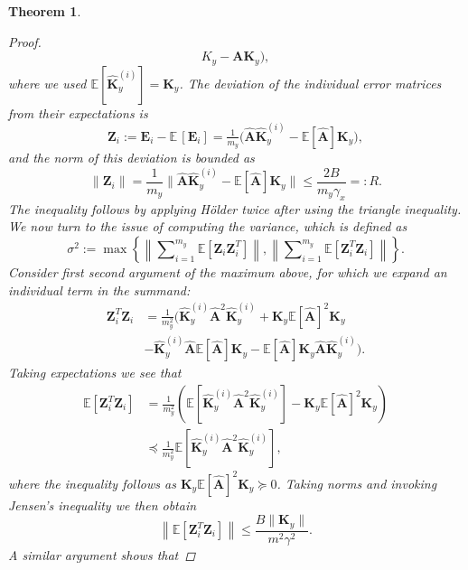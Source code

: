\documentclass{article}
\newcommand{\E}{\mathbb{E}}
\newcommand{\norm}[1]{\left\|#1\right\|}
\newcommand{\nlsum}{\sum\nolimits}
\newtheorem{theorem}{Theorem}
\begin{document}
\begin{theorem}
\begin{proof}
\begin{equation*}
    K_y - \bm A\bm K_y\bigr),
    \end{equation*}
    where we used $\E[\hat{\bm{K}}_y^{(i)}]=\bm K_y$.  The deviation of the
    individual error matrices from their expectations is
    \begin{equation*}
    \bm Z_i := \bm E_i-\mathbb{E}\,[\bm E_i] = \tfrac{1}{m_y}\bigl(\hat{\bm
    A}\hat{\bm K}^{(i)}_y-\mathbb{E}[\hat{\bm A}]\bm K_y\bigr),
    \end{equation*}
    and the norm of this deviation is bounded as
    \begin{equation*}
    \|\bm Z_i\| =\frac{1}{m_y}\|\hat{\bm A}\hat{\bm
    K}^{(i)}_y-\mathbb{E}[\hat{\bm A}]\bm K_y\| \leq \frac{2B}{m_y\gamma_x} =:
    R.
    \end{equation*}
    The inequality follows by applying H\"older twice after using the triangle
    inequality. We now turn to the issue of computing the variance, which is
    defined as
    \begin{equation*}
      \sigma^2 := \max\left\lbrace\norm{\nlsum_{i=1}^{m_y}\E[\bm Z_i\bm
      Z_i^T]},\norm{\nlsum_{i=1}^{m_y}\E[\bm Z_i^T \bm Z_i]}\right\rbrace.
    \end{equation*}
    Consider first second argument of the maximum above, for which we expand an
    individual term in the summand:
    \begin{align*}
      \bm Z_i^T \bm Z_i &= \frac{1}{m_y^2}\Big(\hat{\bm K}_y^{(i)}\hat{\bm
      A}^2\hat{\bm K}_y^{(i)} + \bm K_y\E[\hat{\bm A}]^2\bm K_y \\
      &- \hat{\bm K}_y^{(i)}\hat{\bm A}\E[\hat{\bm A}]\bm K_y - \E[\hat{\bm
      A}]\bm K_y\hat{\bm A}\hat{\bm K}_y^{(i)}\Big).
    \end{align*}
    Taking expectations we see that
    \begin{align*}
        \E[\bm Z_i^T \bm Z_i] &= \frac{1}{m_y^2}\left( \E[\hat{\bm
        K}_y^{(i)}\hat{\bm A}^2\hat{\bm K}_y^{(i)}] - \bm K_y\E[\hat{\bm
        A}]^2\bm K_y\right)\\
        &\preceq \frac{1}{m_y^2}\E[\hat{\bm K}_y^{(i)}\hat{\bm A}^2\hat{\bm K}_y^{(i)}],
    \end{align*}
    where the inequality follows as $\bm K_y\E[\hat{\bm A}]^2\bm K_y\succeq 0$.
    Taking norms and invoking Jensen's inequality we then obtain
    \begin{equation*}
        \norm{\E[\bm Z_i^T\bm Z_i]} \le \frac{B\|\bm K_y\|}{m^2\gamma^2}.
    \end{equation*}
    A similar argument shows that

\end{proof}
\end{theorem}
\end{document}
